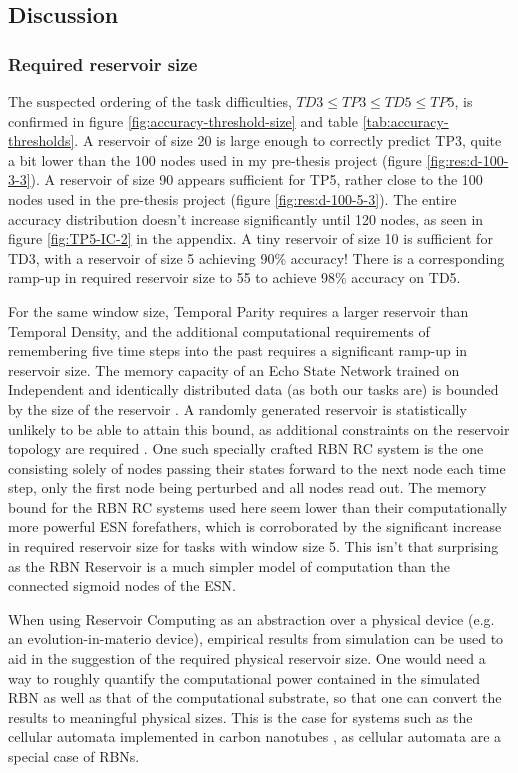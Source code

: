 \subsection{Discussion}

\subsubsection{Required reservoir size}

The suspected ordering of the task difficulties,
$ TD3 \leq TP3 \leq TD5 \leq TP5 $,
is confirmed in figure \ref{fig:accuracy-threshold-size} and table \ref{tab:accuracy-thresholds}.
A reservoir of size 20 is large enough to correctly predict TP3,
quite a bit lower than the 100 nodes used in my pre-thesis project (figure \ref{fig:res:d-100-3-3}).
A reservoir of size 90 appears sufficient for TP5, rather close to the 100 nodes used in the pre-thesis project (figure \ref{fig:res:d-100-5-3}).
The entire accuracy distribution doesn't increase significantly until 120 nodes,
as seen in figure \ref{fig:TP5-IC-2} in the appendix.
A tiny reservoir of size 10 is sufficient for TD3,
with a reservoir of size 5 achieving 90\% accuracy!
There is a corresponding ramp-up in required reservoir size to 55 to achieve 98\% accuracy on TD5.

For the same window size, Temporal Parity requires a larger reservoir than Temporal Density,
and the additional computational requirements of remembering five time steps into the past requires a significant ramp-up in reservoir size.
The memory capacity of an Echo State Network trained on Independent and identically distributed data (as both our tasks are) is bounded by the size of the reservoir \cite{Jaeger:2007}.
A randomly generated reservoir is statistically unlikely to be able to attain this bound,
as additional constraints on the reservoir topology are required \cite{Jaeger:2007}.
One such specially crafted RBN RC system is the one consisting solely of nodes passing their states forward to the next node each time step,
only the first node being perturbed and all nodes read out.
The memory bound for the RBN RC systems used here seem lower than their computationally more powerful ESN forefathers,
which is corroborated by the significant increase in required reservoir size for tasks with window size 5.
This isn't that surprising as the RBN Reservoir is a much simpler model of computation than the connected sigmoid nodes of the ESN.

When using Reservoir Computing as an abstraction over a physical device (e.g. an evolution-in-materio device),
empirical results from simulation can be used to aid in the suggestion of the required physical reservoir size.
One would need a way to roughly quantify the computational power contained in the simulated RBN as well as that of the computational substrate,
so that one can convert the results to meaningful physical sizes.
This is the case for systems such as the cellular automata implemented in carbon nanotubes \cite{farstad2015evolving},
as cellular automata are a special case of RBNs.

